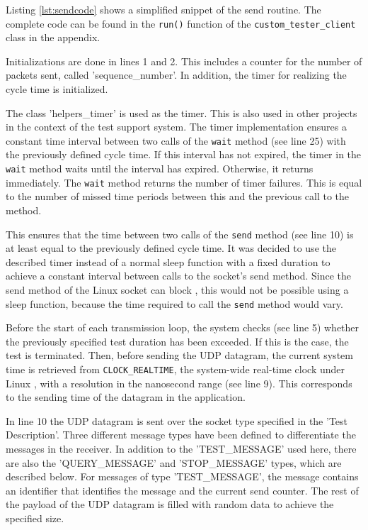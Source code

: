 Listing \ref{lst:sendcode} shows a simplified snippet of the send routine. The complete code can be found in the \texttt{run()} function of the \texttt{custom\_tester\_client} class in the appendix.

Initializations are done in lines 1 and 2. This includes a counter for the number of packets sent, called 'sequence\_number'. In addition, the timer for realizing the cycle time is initialized.

The class 'helpers\_timer' is used as the timer. This is also used in other projects in the context of the test support system. The timer implementation ensures a constant time interval between two calls of the \texttt{wait} method (see line 25) with the previously defined cycle time. If this interval has not expired, the timer in the \texttt{wait} method waits until the interval has expired. Otherwise, it returns immediately. The \texttt{wait} method returns the number of timer failures. This is equal to the number of missed time periods between this and the previous call to the method.

This ensures that the time between two calls of the \texttt{send} method (see line 10) is at least equal to the previously defined cycle time. It was decided to use the described timer instead of a normal sleep function with a fixed duration to achieve a constant interval between calls to the socket's send method. Since the send method of the Linux socket can block \cite{tsgen01}, this would not be possible using a sleep function, because the time required to call the \texttt{send} method would vary.

Before the start of each transmission loop, the system checks (see line 5) whether the previously specified test duration has been exceeded. If this is the case, the test is terminated. Then, before sending the UDP datagram, the current system time is retrieved from \texttt{CLOCK\_REALTIME}, the system-wide real-time clock under Linux \cite{tsgen02}, with a resolution in the nanosecond range (see line 9). This corresponds to the sending time of the datagram in the application.

In line 10 the UDP datagram is sent over the socket type specified in the 'Test Description'. Three different message types have been defined to differentiate the messages in the receiver. In addition to the 'TEST\_MESSAGE' used here, there are also the 'QUERY\_MESSAGE' and 'STOP\_MESSAGE' types, which are described below. For messages of type 'TEST\_MESSAGE', the message contains an identifier that identifies the message and the current send counter. The rest of the payload of the UDP datagram is filled with random data to achieve the specified size.

